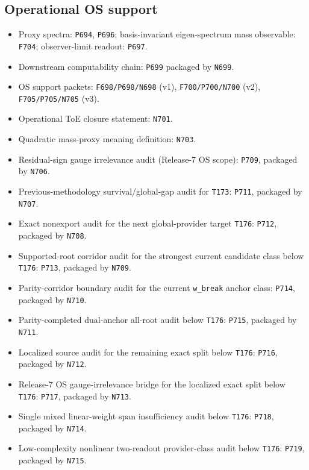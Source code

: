 \documentclass[11pt,a4paper]{article}
\begin{document}
\subsection{Operational OS support}

\begin{itemize}
  \item Proxy spectra: \texttt{P694}, \texttt{P696}; basis-invariant eigen-spectrum mass observable: \texttt{F704}; observer-limit readout: \texttt{P697}.
  \item Downstream computability chain: \texttt{P699} packaged by \texttt{N699}.
  \item OS support packets: \texttt{F698/P698/N698} (v1), \texttt{F700/P700/N700} (v2), \texttt{F705/P705/N705} (v3).
  \item Operational ToE closure statement: \texttt{N701}.
  \item Quadratic mass-proxy meaning definition: \texttt{N703}.
  \item Residual-sign gauge irrelevance audit (Release-7 OS scope): \texttt{P709}, packaged by \texttt{N706}.
  \item Previous-methodology survival/global-gap audit for \texttt{T173}: \texttt{P711}, packaged by \texttt{N707}.
  \item Exact nonexport audit for the next global-provider target \texttt{T176}: \texttt{P712}, packaged by \texttt{N708}.
  \item Supported-root corridor audit for the strongest current candidate class below \texttt{T176}: \texttt{P713}, packaged by \texttt{N709}.
  \item Parity-corridor boundary audit for the current \texttt{w\_break} anchor class: \texttt{P714}, packaged by \texttt{N710}.
  \item Parity-completed dual-anchor all-root audit below \texttt{T176}: \texttt{P715}, packaged by \texttt{N711}.
  \item Localized source audit for the remaining exact split below \texttt{T176}: \texttt{P716}, packaged by \texttt{N712}.
  \item Release-7 OS gauge-irrelevance bridge for the localized exact split below \texttt{T176}: \texttt{P717}, packaged by \texttt{N713}.
  \item Single mixed linear-weight span insufficiency audit below \texttt{T176}: \texttt{P718}, packaged by \texttt{N714}.
  \item Low-complexity nonlinear two-readout provider-class audit below \texttt{T176}: \texttt{P719}, packaged by \texttt{N715}.

\end{itemize}
\end{document}
